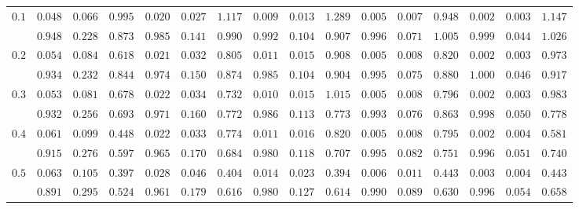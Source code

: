 \begin{table}
\begin{center}
\begin{tabular}{|c|ccc|ccc|ccc|ccc|ccc|}
\hline 
$0.1$ & $ 0.048 $ & $ 0.066 $ & $ 0.995 $ & $ 0.020 $ & $ 0.027 $ & $ 1.117 $ & $ 0.009 $ & $ 0.013 $ & $ 1.289 $ & $ 0.005 $ & $ 0.007 $ & $ 0.948 $ & $ 0.002 $ & $ 0.003 $ & $ 1.147 $\\ 
 & $ 0.948 $ & $ 0.228 $ & $ 0.873 $ & $ 0.985 $ & $ 0.141 $ & $ 0.990 $ & $ 0.992 $ & $ 0.104 $ & $ 0.907 $ & $ 0.996 $ & $ 0.071 $ & $ 1.005 $ & $ 0.999 $ & $ 0.044 $ & $ 1.026 $\\ 
\hline 
$0.2$ & $ 0.054 $ & $ 0.084 $ & $ 0.618 $ & $ 0.021 $ & $ 0.032 $ & $ 0.805 $ & $ 0.011 $ & $ 0.015 $ & $ 0.908 $ & $ 0.005 $ & $ 0.008 $ & $ 0.820 $ & $ 0.002 $ & $ 0.003 $ & $ 0.973 $\\ 
 & $ 0.934 $ & $ 0.232 $ & $ 0.844 $ & $ 0.974 $ & $ 0.150 $ & $ 0.874 $ & $ 0.985 $ & $ 0.104 $ & $ 0.904 $ & $ 0.995 $ & $ 0.075 $ & $ 0.880 $ & $ 1.000 $ & $ 0.046 $ & $ 0.917 $\\ 
\hline 
$0.3$ & $ 0.053 $ & $ 0.081 $ & $ 0.678 $ & $ 0.022 $ & $ 0.034 $ & $ 0.732 $ & $ 0.010 $ & $ 0.015 $ & $ 1.015 $ & $ 0.005 $ & $ 0.008 $ & $ 0.796 $ & $ 0.002 $ & $ 0.003 $ & $ 0.983 $\\ 
 & $ 0.932 $ & $ 0.256 $ & $ 0.693 $ & $ 0.971 $ & $ 0.160 $ & $ 0.772 $ & $ 0.986 $ & $ 0.113 $ & $ 0.773 $ & $ 0.993 $ & $ 0.076 $ & $ 0.863 $ & $ 0.998 $ & $ 0.050 $ & $ 0.778 $\\ 
\hline 
$0.4$ & $ 0.061 $ & $ 0.099 $ & $ 0.448 $ & $ 0.022 $ & $ 0.033 $ & $ 0.774 $ & $ 0.011 $ & $ 0.016 $ & $ 0.820 $ & $ 0.005 $ & $ 0.008 $ & $ 0.795 $ & $ 0.002 $ & $ 0.004 $ & $ 0.581 $\\ 
 & $ 0.915 $ & $ 0.276 $ & $ 0.597 $ & $ 0.965 $ & $ 0.170 $ & $ 0.684 $ & $ 0.980 $ & $ 0.118 $ & $ 0.707 $ & $ 0.995 $ & $ 0.082 $ & $ 0.751 $ & $ 0.996 $ & $ 0.051 $ & $ 0.740 $\\ 
\hline 
$0.5$ & $ 0.063 $ & $ 0.105 $ & $ 0.397 $ & $ 0.028 $ & $ 0.046 $ & $ 0.404 $ & $ 0.014 $ & $ 0.023 $ & $ 0.394 $ & $ 0.006 $ & $ 0.011 $ & $ 0.443 $ & $ 0.003 $ & $ 0.004 $ & $ 0.443 $\\ 
 & $ 0.891 $ & $ 0.295 $ & $ 0.524 $ & $ 0.961 $ & $ 0.179 $ & $ 0.616 $ & $ 0.980 $ & $ 0.127 $ & $ 0.614 $ & $ 0.990 $ & $ 0.089 $ & $ 0.630 $ & $ 0.996 $ & $ 0.054 $ & $ 0.658 $\\ 
\hline 

\end{tabular}
\end{center}
\end{table}
